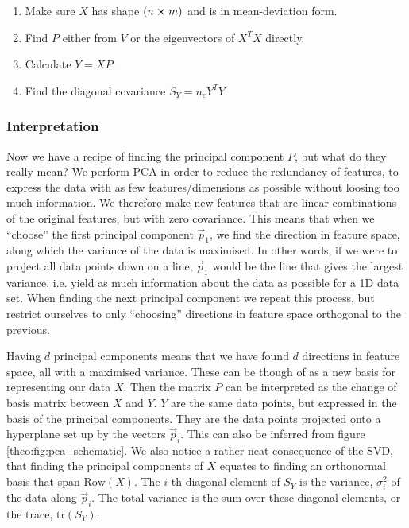     \begin{enumerate}
        \item Make sure $X$ has shape $(n\cross m)$ and is in mean-deviation form.
        \item Find $P$ either from $V$ or the eigenvectors of $X^TX$ directly.
        \item Calculate $Y=XP$.
        \item Find the diagonal covariance $S_Y=n_cY^TY$.
    \end{enumerate}
    
    \subsubsection{Interpretation}
    Now we have a recipe of finding the principal component $P$, but what do they really mean? We perform PCA in order to reduce the redundancy of features, to express the data with as few features/dimensions as possible without loosing too much information. We therefore make new features that are linear combinations of the original features, but with zero covariance. This means that when we ``choose'' the first principal component $\vec{p}_1$, we find the direction in feature space, along which the variance of the data is maximised. In other words, if we were to project all data points down on a line, $\vec{p}_1$ would be the line that gives the largest variance, i.e. yield as much information about the data as possible for a 1D data set. When finding the next principal component we repeat this process, but restrict ourselves to only ``choosing'' directions in feature space orthogonal to the previous. 
    
    Having $d$ principal components means that we have found $d$ directions in feature space, all with a maximised variance. These can be though of as a new basis for representing our data $X$. Then the matrix $P$ can be interpreted as the change of basis matrix between $X$ and $Y$. $Y$ are the same data points, but expressed in the basis of the principal components. They are the data points projected onto a hyperplane set up by the vectors $\vec{p}_i$. This can also be inferred from figure \ref{theo:fig:pca_schematic}. We also notice a rather neat consequence of the SVD, that finding the principal components of $X$ equates to finding an orthonormal basis that span $\text{Row}(X)$. The $i$-th diagonal element of $S_Y$ is the variance, $\sigma_i^2$ of the data along $\vec{p}_i$. The total variance is the sum over these diagonal elements, or the trace, $\text{tr}(S_Y)$.

